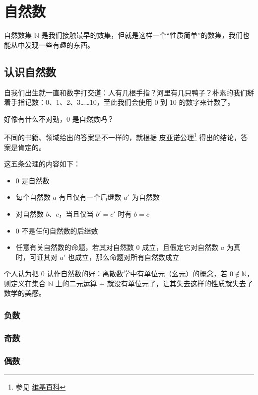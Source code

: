 \chapter{自然数}

自然数集 $\mathbb{N}$ 是我们接触最早的数集，但就是这样一个“性质简单”的数集，我们也能从中发现一些有趣的东西。

\section{认识自然数}

自我们出生就一直和数字打交道：人有几根手指？河里有几只鸭子？朴素的我们掰着手指记数：0、1、2、3……10，至此我们会使用 0 到 10 的数字来计数了。

好像有什么不对劲，0 是自然数吗？

不同的书籍、领域给出的答案是不一样的，就根据 皮亚诺公理\footnote{参见 \href{https://zh.wikipedia.org/wiki/\%E7\%9A\%AE\%E4\%BA\%9A\%E8\%AF\%BA\%E5\%85\%AC\%E7\%90\%86}{维基百科}} 得出的结论，答案是肯定的。

这五条公理的内容如下：

\begin{itemize}
  \item $0$ 是自然数
  \item 每个自然数 $a$ 有且仅有一个后继数 $a'$ 为自然数
  \item 对自然数 $b$、$c$，当且仅当 $b' = c'$ 时有 $b = c$
  \item $0$ 不是任何自然数的后继数
  \item 任意有关自然数的命题，若其对自然数 $0$ 成立，且假定它对自然数 $a$ 为真时，可证其对 $a'$ 也成立，那么命题对所有自然数成立
\end{itemize}

个人认为把 0 认作自然数的好：离散数学中有单位元（幺元）的概念，若 $0 \notin \mathbb{N}$，则定义在集合 $\mathbb{N}$ 上的二元运算 $+$ 就没有单位元了，让其失去这样的性质就失去了数学的美感。

\subsection{负数}

\subsection{奇数}

\subsection{偶数}

